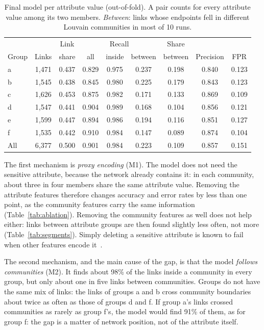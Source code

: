 \documentclass[runningheads]{llncs}
\begin{document}
\begin{table}[t]
\centering
\small
\caption{Final model per attribute value (out-of-fold). A pair counts for every attribute value among its two members. \emph{Between}: links whose endpoints fell in different Louvain communities in most of 10 runs.}
\label{tab:groups}
\begin{tabular}{lcc|ccc|c|cc}
\hline
 & & Link & \multicolumn{3}{c|}{Recall} & Share & & \\
Group & Links & share & all & inside & between & between & Precision & FPR \\
\hline
a   & 1{,}471 & 0.437 & 0.829 & 0.975 & 0.237 & 0.198 & 0.840 & 0.123 \\
b   & 1{,}545 & 0.438 & 0.845 & 0.980 & 0.225 & 0.179 & 0.843 & 0.123 \\
c   & 1{,}626 & 0.453 & 0.875 & 0.982 & 0.171 & 0.133 & 0.869 & 0.109 \\
d   & 1{,}547 & 0.441 & 0.904 & 0.989 & 0.168 & 0.104 & 0.856 & 0.121 \\
e   & 1{,}599 & 0.447 & 0.894 & 0.986 & 0.194 & 0.116 & 0.851 & 0.127 \\
f   & 1{,}535 & 0.442 & 0.910 & 0.984 & 0.147 & 0.089 & 0.874 & 0.104 \\
\hline
All & 6{,}377 & 0.500 & 0.901 & 0.984 & 0.223 & 0.109 & 0.857 & 0.151 \\
\hline
\end{tabular}
\end{table}

The first mechanism is \emph{proxy encoding} (M1). The model does not need the sensitive attribute, because the network already contains it: in each community, about three in four members share the same attribute value. Removing the attribute features therefore changes accuracy and error rates by less than one point, as the community features carry the same information (Table~\ref{tab:ablation}). Removing the community features as well does not help either: links between attribute groups are then found slightly less often, not more (Table~\ref{tab:segments}). Simply deleting a sensitive attribute is known to fail when other features encode it~\cite{barocas2023}.

The second mechanism, and the main cause of the gap, is that the model \emph{follows communities} (M2). It finds about 98\% of the links inside a community in every group, but only about one in five links between communities. Groups do not have the same mix of links: the links of groups a and b cross community boundaries about twice as often as those of groups d and f. If group a's links crossed communities as rarely as group f's, the model would find 91\% of them, as for group f: the gap is a matter of network position, not of the attribute itself.
\end{document}
